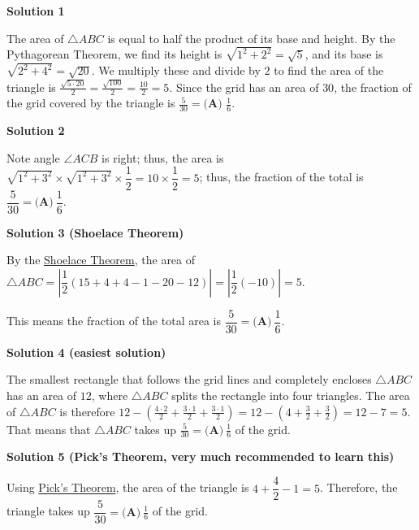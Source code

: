 \begin{enumerate}
\textbf{Solution 1}

The area of $\triangle ABC$ is equal to half the product of its base and height.  By the Pythagorean Theorem, we find its height is $\sqrt{1^2+2^2}=\sqrt{5}$, and its base is $\sqrt{2^2+4^2}=\sqrt{20}$.  We multiply these and divide by $2$ to find the area of the triangle is $\frac{\sqrt{5 \cdot 20}}2=\frac{\sqrt{100}}2=\frac{10}2=5$.  Since the grid has an area of $30$, the fraction of the grid covered by the triangle is $\frac 5{30}=\boxed{\textbf{(A) }\frac{1}{6}}$.

 


 



\textbf{Solution 2}

Note angle $\angle ACB$ is right; thus, the area is $\sqrt{1^2+3^2} \times \sqrt{1^2+3^2}\times \dfrac{1}{2}=10 \times \dfrac{1}{2}=5$; thus, the fraction of the total is $\dfrac{5}{30}=\boxed{\textbf{(A)}~\dfrac{1}{6}}$.

 


 



\textbf{Solution 3 (Shoelace Theorem)}

By the \href{https://artofproblemsolving.com/wiki/index.php?title=Shoelace\_Theorem}{Shoelace Theorem}, the area of $\triangle ABC=|\dfrac{1}{2}(15+4+4-1-20-12)|=|\dfrac{1}{2}(-10)|=5$.

 This means the fraction of the total area is $\dfrac{5}{30}=\boxed{\textbf{(A)}~\dfrac{1}{6}}$.

 



\textbf{Solution 4 (easiest solution)}

The smallest rectangle that follows the grid lines and completely encloses $\triangle ABC$ has an area of $12$, where $\triangle ABC$ splits the rectangle into four triangles. The area of $\triangle ABC$ is therefore $12 - (\frac{4 \cdot 2}{2}+\frac{3 \cdot 1}{2}+\frac{3 \cdot 1}{2}) = 12 - (4 + \frac{3}{2} + \frac{3}{2}) = 12 - 7 = 5$. That means that $\triangle ABC$ takes up $\frac{5}{30} = \boxed{\textbf{(A)}~\frac{1}{6}}$ of the grid.

 



\textbf{Solution 5 (Pick's Theorem, very much recommended to learn this)}

Using \href{https://artofproblemsolving.com/wiki/index.php?title=Pick\%27s\_Theorem}{Pick's Theorem}, the area of the triangle is $4 + \dfrac{4}{2} - 1=5$. Therefore, the triangle takes up $\dfrac{5}{30}=\boxed{\textbf{(A)}~\frac{1}{6}}$ of the grid.


\end{enumerate}
